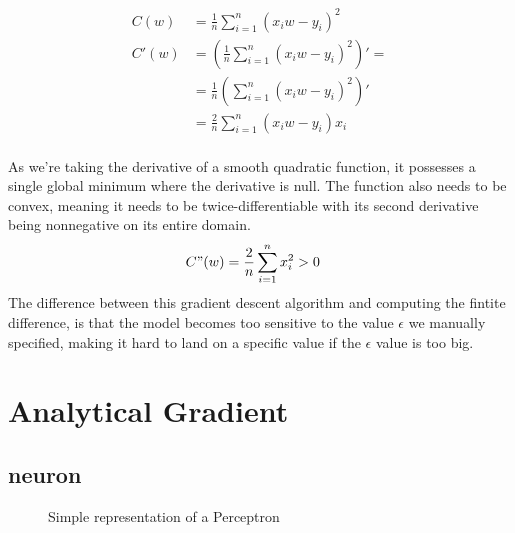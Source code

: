 \documentclass[12pt]{article}
\begin{document}
    \begin{align} 
        C(w) &= \frac{1}{n}\sum_{i=1}^{n}(x_{i}w - y_{i})^{2} \\ 
        C'(w) &= \left(\frac{1}{n}\sum_{i=1}^{n}(x_{i}w - y_{i})^{2}\right)' = \\ 
        &= \frac{1}{n}\left(\sum_{i=1}^{n}(x_{i}w - y_{i})^{2}\right)' \\ 
        &= \frac{2}{n}\sum_{i=1}^{n}(x_{i}w - y_{i})x_{i} \\ 
    \end{align} 

    As we're taking the derivative of a smooth quadratic function, it possesses a single global minimum where the derivative 
    is null. The function also needs to be convex, meaning it needs to be twice-differentiable with its second derivative 
    being nonnegative on its entire domain. 
    \begin{align} 
        C"(w) &=\frac{2}{n}\sum_{i=1}^{n}x_{i}^{2} > 0
    \end{align}
    The difference between this gradient descent algorithm and computing the fintite difference, is that the model becomes
    too sensitive to the value $\epsilon$ we manually specified, making it hard to land on a specific value if the $\epsilon$
    value is too big. 

    \section{Analytical Gradient}
    


    \subsection{neuron}
    \begin{figure}[htbp]
        \centering
        \caption{Simple representation of a Perceptron}
        \label{fig:n1i}
    \end{figure}
\end{document}

